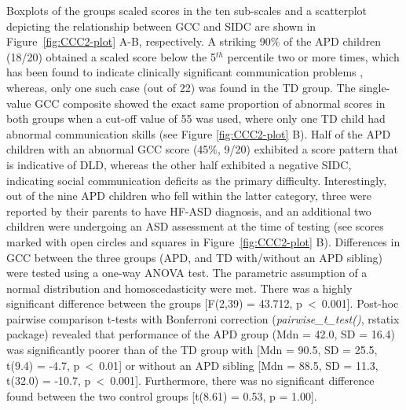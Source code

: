 \documentclass[a4paper, twoside]{templates/ociamthesis}
\begin{document}
Boxplots of the groups scaled scores in the ten sub-scales and a scatterplot depicting the relationship between GCC and SIDC are shown in Figure~\ref{fig:CCC2-plot} A-B, respectively. A striking 90\% of the APD children (18/20) obtained a scaled score below the 5\(^{th}\) percentile two or more times, which has been found to indicate clinically significant communication problems \autocite{Bishop2003}, whereas, only one such case (out of 22) was found in the TD group. The single-value GCC composite showed the exact same proportion of abnormal scores in both groups when a cut-off value of 55 was used, where only one TD child had abnormal communication skills (see Figure \ref{fig:CCC2-plot} B). Half of the APD children with an abnormal GCC score (45\%, 9/20) exhibited a score pattern that is indicative of DLD, whereas the other half exhibited a negative SIDC, indicating social communication deficits as the primary difficulty. Interestingly, out of the nine APD children who fell within the latter category, three were reported by their parents to have HF-ASD diagnosis, and an additional two children were undergoing an ASD assessment at the time of testing (see scores marked with open circles and squares in Figure~\ref{fig:CCC2-plot} B). Differences in GCC between the three groups (APD, and TD with/without an APD sibling) were tested using a one-way ANOVA test. The parametric assumption of a normal distribution and homoscedasticity were met. There was a highly significant difference between the groups {[}F(2,39) = 43.712, p~\textless~0.001{]}. Post-hoc pairwise comparison t-tests with Bonferroni correction (\emph{pairwise\_t\_test()}, rstatix package) revealed that performance of the APD group (Mdn = 42.0, SD = 16.4) was significantly poorer than of the TD group with {[}Mdn = 90.5, SD = 25.5, t(9.4) = -4.7, p~\textless~0.01{]} or without an APD sibling {[}Mdn = 88.5, SD = 11.3, t(32.0) = -10.7, p~\textless~0.001{]}. Furthermore, there was no significant difference found between the two control groups {[}t(8.61) = 0.53, p = 1.00{]}.\\
\end{document}
